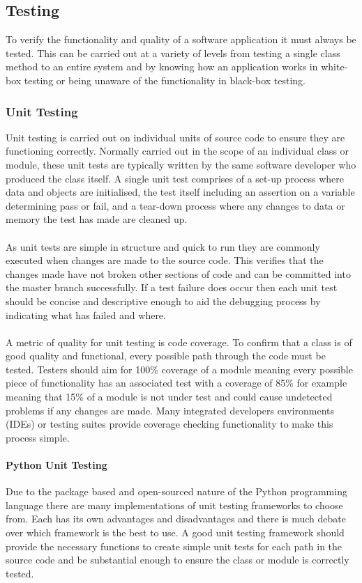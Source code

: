 \subsection{Testing}
	To verify the functionality and quality of a software application it must always be tested. This can be carried out at a variety of levels from testing a single class method to an entire system and by knowing how an application works in white-box testing or being unaware of the functionality in black-box testing.
	\subsubsection{Unit Testing}
		Unit testing is carried out on individual units of source code to ensure they are functioning correctly. Normally carried out in the scope of an individual class or module, these unit tests are typically written by the same software developer who produced the class itself. A single unit test comprises of a set-up process where data and objects are initialised, the test itself including an assertion on a variable determining pass or fail, and a tear-down process where any changes to data or memory the test has made are cleaned up.
		\\\\
		As unit tests are simple in structure and quick to run they are commonly executed when changes are made to the source code. This verifies that the changes made have not broken other sections of code and can be committed into the master branch successfully. If a test failure does occur then each unit test should be concise and descriptive enough to aid the debugging process by indicating what has failed and where.
		\\\\
		A metric of quality for unit testing is code coverage. To confirm that a class is of good quality and functional, every possible path through the code must be tested. Testers should aim for 100\% coverage of a module meaning every possible piece of functionality has an associated test with a coverage of 85\% for example meaning that 15\% of a module is not under test and could cause undetected problems if any changes are made. Many integrated developers environments (IDEs) or testing suites provide coverage checking functionality to make this process simple.
		\paragraph{Python Unit Testing}
			Due to the package based and open-sourced nature of the Python programming language there are many implementations of unit testing frameworks to choose from. Each has its own advantages and disadvantages and there is much debate over which framework is the best to use. A good unit testing framework should provide the necessary functions to create simple unit tests for each path in the source code and be substantial enough to ensure the class or module is correctly tested.
